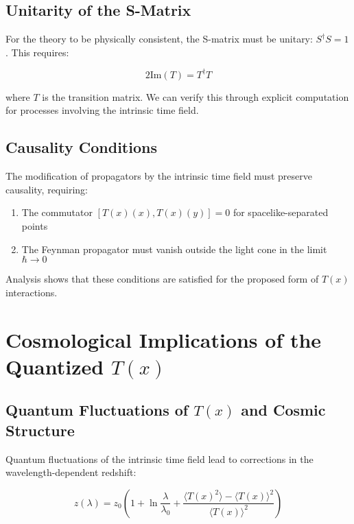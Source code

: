 \documentclass[12pt,a4paper]{article}
\newcommand{\Tfield}{T(x)}
\begin{document}
	\subsection{Unitarity of the S-Matrix}
	\label{sec:unitaritaet}
	
	For the theory to be physically consistent, the S-matrix must be unitary: $S^{\dagger}S = 1$. This requires:
	
	\begin{equation}
		2\mathrm{Im}(T) = T^{\dagger}T
	\end{equation}
	
	where $T$ is the transition matrix. We can verify this through explicit computation for processes involving the intrinsic time field.
	
	\subsection{Causality Conditions}
	\label{sec:kausalitaet}
	
	The modification of propagators by the intrinsic time field must preserve causality, requiring:
	
	\begin{enumerate}
		\item The commutator $[\Tfield(x), \Tfield(y)] = 0$ for spacelike-separated points
		\item The Feynman propagator must vanish outside the light cone in the limit $\hbar \to 0$
	\end{enumerate}
	
	Analysis shows that these conditions are satisfied for the proposed form of $\Tfield$ interactions.
	
	\section{Cosmological Implications of the Quantized $\Tfield$}
	\label{sec:kosmologische_implikationen}
	
	\subsection{Quantum Fluctuations of $\Tfield$ and Cosmic Structure}
	\label{sec:quantenfluktuationen}
	
	Quantum fluctuations of the intrinsic time field lead to corrections in the wavelength-dependent redshift:
	
	\begin{equation}
		z(\lambda) = z_0\left(1 + \ln\frac{\lambda}{\lambda_0} + \frac{\langle \Tfield^2 \rangle - \langle \Tfield \rangle^2}{\langle \Tfield \rangle^2}\right)
	\end{equation}
	
\end{document}
